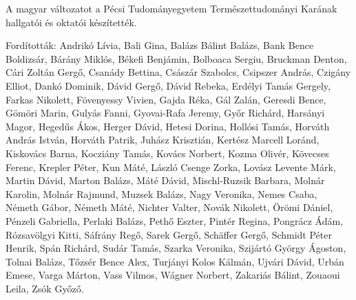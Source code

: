 {
A magyar változatot a Pécsi Tudományegyetem Természettudományi Karának hallgatói és oktatói készítették.

Fordították:
Andrikó Lívia, Bali Gina, Balázs Bálint Balázs, Bank Bence Boldizsár, Bárány Miklós, Békefi Benjámin, Bolboaca Sergiu, Bruckman Denton,
Cári Zoltán Gergő, Csanády Bettina, Császár Szabolcs, Csipszer András, Czigány Elliot,
Dankó Dominik, Dávid Gergő, Dávid Rebeka, Erdélyi Tamás Gergely,
Farkas Nikolett, Fövenyessy Vivien,
Gajda Réka, Gál Zalán, Geresdi Bence, Gömöri Marin, Gulyás Fanni, Gyovai-Rafa Jeremy, Győr Richárd,
Harsányi Magor, Hegedűs Ákos, Herger Dávid, Hetesi Dorina, Hollósi Tamás, Horváth András István, Horváth Patrik,
Juhász Krisztián,
Kertész Marcell Loránd, Kiskovács Barna, Kocziány Tamás, Kovács Norbert, Kozma Olivér, Kövecses Ferenc, Krepler Péter, Kun Máté,
László Csenge Zorka, Lovász Levente Márk,
Martin Dávid, Marton Balázs, Máté Dávid, Mischl-Ruzsik Barbara, Molnár Karolin, Molnár Rajmund, Muzsek Balázs,
Nagy Veronika, Nemes Csaba, Németh Gábor, Németh Máté, Nichter Valter, Novák Nikolett,
Örömi Dániel,
Pénzeli Gabriella, Perlaki Balázs, Pethő Eszter, Pintér Regina, Pongrácz Ádám,
Rózsavölgyi Kitti,
Sáfrány Regő, Sarek Gergő, Schäffer Gergő, Schmidt Péter Henrik, Spán Richárd, Sudár Tamás,
Szarka Veronika, Szijártó György Ágoston,
Tolnai Balázs, Tőzsér Bence Alex, Turjányi Kolos Kálmán, Ujvári Dávid, Urbán Emese,
Varga Márton, Vass Vilmos, Wágner Norbert, Zakariás Bálint, Zouaoui Leila, Zsók Győző.
}